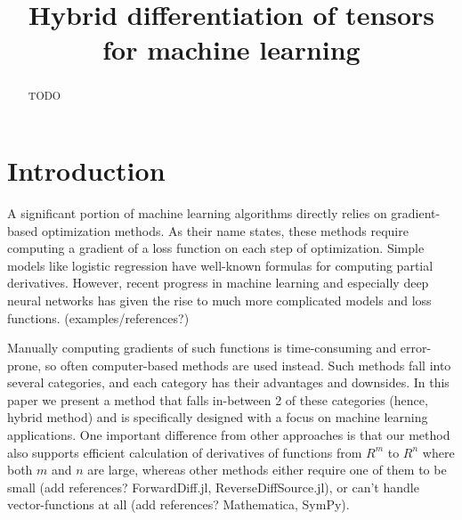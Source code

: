 \documentclass[conference]{IEEEtran}
\begin{document}
\title{Hybrid differentiation of tensors \\ for machine learning}


\author{
\and
{}
\and
{}
}

\maketitle


\begin{abstract}
TODO


\end{abstract}


\IEEEpeerreviewmaketitle


\section{Introduction}

A significant portion of machine learning algorithms directly relies on gradient-based optimization methods. As their name states, these methods require computing a gradient of a loss function on each step of optimization. Simple models like logistic regression have well-known formulas for computing partial derivatives. However, recent progress in machine learning and especially deep neural networks has given the rise to much more complicated models and loss functions. (examples/references?) 

Manually computing gradients of such functions is time-consuming and error-prone, so often computer-based methods are used instead. Such methods fall into several categories, and each category has their advantages and downsides. In this paper we present a method that falls in-between 2 of these categories (hence, hybrid method) and is specifically designed with a focus on machine learning applications. One important difference from other approaches is that our method also supports efficient calculation of derivatives of functions from $R^m$ to $R^n$ where both $m$ and $n$ are large, whereas other methods either require one of them to be small (add references? ForwardDiff.jl, ReverseDiffSource.jl), or can't handle vector-functions at all (add references? Mathematica, SymPy). 
\end{document}
